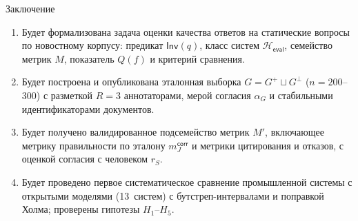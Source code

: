 \documentclass[t]{beamer}
\let\mathrm\mathsf  %
\newcommand{\Inv}{\mathrm{Inv}}
\newcommand{\Heval}{\mathcal{H}_{\mathrm{eval}}}
\newcommand{\refuse}{\bot}
\newcommand{\mcorr}{m_J^{\mathrm{corr}}}
\newcommand{\rS}{r_{S}}
\begin{document}
\begin{frame}[plain]{Заключение}
    \begin{enumerate}
        \item Будет формализована задача оценки качества ответов на статические вопросы по новостному корпусу: предикат $\Inv(q)$, класс систем $\Heval$, семейство метрик $M$, показатель $Q(f)$ и критерий сравнения.
        \item Будет построена и опубликована эталонная выборка $G=G^+\sqcup G^{\refuse}$ ($n=200$--$300$) с разметкой $R=3$ аннотаторами, мерой согласия $\alpha_G$ и стабильными идентификаторами документов.
        \item Будет получено валидированное подсемейство метрик $M'$, включающее метрику правильности по эталону $\mcorr$ и метрики цитирования и отказов, с оценкой согласия с человеком $\rS$.
        \item Будет проведено первое систематическое сравнение промышленной системы с открытыми моделями (13~систем) с бутстреп-интервалами и поправкой Холма; проверены гипотезы $H_1$--$H_5$.
    \end{enumerate}
\end{frame}
\end{document}
